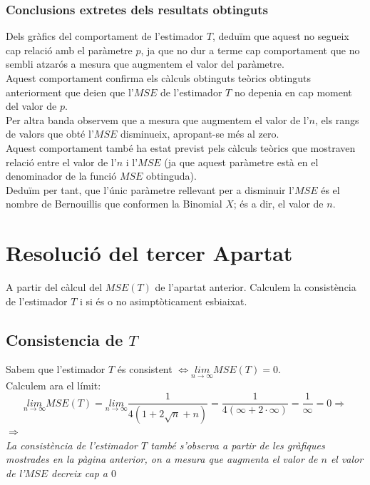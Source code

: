 \documentclass[12pt]{article}
\begin{document}
\begin{itemize}
\subsubsection{Conclusions extretes dels resultats obtinguts}
Dels gràfics del comportament de l'estimador $T$, deduïm que aquest no segueix cap relació amb el paràmetre $p$, ja que no dur a terme cap comportament que no sembli atzarós a mesura que augmentem el valor del paràmetre.\\ Aquest comportament confirma els càlculs obtinguts teòrics obtinguts anteriorment que deien que l'$MSE$ de l'estimador $T$ no depenia en cap moment del valor de $p$.\\ Per altra banda observem que a mesura que augmentem el valor de l'$n$, els rangs de valors que obté l'$MSE$ disminueix, apropant-se més al zero.\\ Aquest comportament també ha estat previst pels càlculs teòrics que mostraven relació entre el valor de l'$n$ i l'$MSE$ (ja que aquest paràmetre està en el denominador de la funció $MSE$ obtinguda). \\Deduïm per tant, que l'únic paràmetre rellevant per a disminuir l'$MSE$ és el nombre de Bernouillis que conformen la Binomial $X$; és a dir, el valor de $n$.
\end{itemize}

\newpage
\section{Resolució del tercer Apartat}
A partir del càlcul del $MSE(T)$ de l'apartat anterior. Calculem la consistència de l'estimador $T$ i si és o no asimptòticament esbiaixat.

\subsection{Consistencia de $T$}
Sabem que l'estimador $T$ és consistent $\Longleftrightarrow \underset{n\rightarrow\infty}{lim}MSE(T) = 0$. \\Calculem ara el límit:
\begin{equation*}
\underset{n\rightarrow\infty}{lim}MSE(T)=\underset{n\rightarrow\infty}{lim}\frac{1}{4(1+2\sqrt{n}+n)}=\frac{1}{4(\infty+2\cdot\infty)}=\frac{1}{\infty}=0\Longrightarrow
\end{equation*}
$\Longrightarrow$ \textcolor{blue}{}\\
\textit{La consistència de l'estimador $T$ també s'observa a partir de les gràfiques mostrades en la pàgina anterior, on a mesura que augmenta el valor de $n$ el valor de l'$MSE$ decreix cap a $0$}
\end{document}
